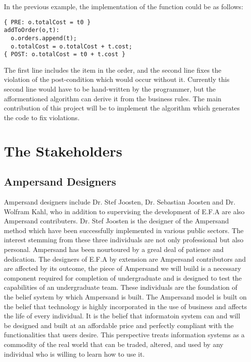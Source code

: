 \documentclass[12pt]{report}
\begin{document}
In the previous example, the implementation of the
function could be as follows: 

\begin{verbatim}
{ PRE: o.totalCost = t0 } 
addToOrder(o,t): 
  o.orders.append(t);
  o.totalCost = o.totalCost + t.cost;
{ POST: o.totalCost = t0 + t.cost } 
\end{verbatim}

The first line includes the item in the order, and the second line fixes the
violation of the post-condition which would occur without it. Currently this
second line would have to be hand-written by the programmer, but the
afformentioned  algorithm can derive it from the business rules. The main
contribution of this project will be to implement the algorithm which generates
the code to fix violations.

\section{The Stakeholders}\label{sec:Stakeholders}
\subsection{Ampersand Designers}\label{subsec:Ampersand}
Ampersand designers include Dr. Stef Joosten, Dr. Sebastian Joosten and Dr. 
Wolfram Kahl, who in addition to supervising the development of E.F.A are also 
Ampersand contributers. Dr. Stef Joosten is the designer of the Ampersand 
method which have been successfully implemented in various public sectors. The 
interest stemming from these three individuals are not only professional but 
also personal. Ampersand has been nourtoured by a greal deal of patience and 
dedication. The designers of E.F.A by extension are Ampersand contributors and 
are affected by its outcome, the piece of Ampersand we will build is a 
necessary component required for completion of undergraduate and is designed to 
test the capabilities of an undergraduate team. 
These individuals are the foundation of the belief system by which Ampersand is 
built. The Ampersand model is built on the belief that technology is highly 
incorporated in the use of business and affects the life of every individual. 
It is the belief that informatoin system can and will be designed and built at 
an affordable price and perfectly compliant with the functionalities that users 
desire. This perspective treats information systems as a commodity of the real 
world that can be traded, altered, and used by any individual who is willing to 
learn how to use it.
\end{document}
